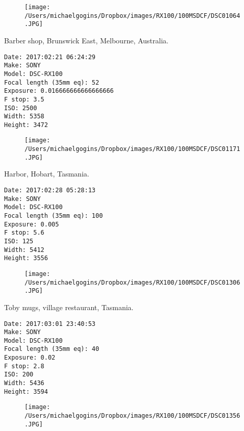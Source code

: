 \documentclass[11pt,letter,DIV=14,paper=landscape]{scrbook}
\begin{document}
\begin{figure}
\texttt{[image: /Users/michaelgogins/Dropbox/images/RX100/100MSDCF/DSC01064.JPG]}
\end{figure}
    
\clearpage
\noindent Barber shop, Brunswick East, Melbourne, Australia.
\noindent
\begin{lstlisting}
Date: 2017:02:21 06:24:29
Make: SONY
Model: DSC-RX100
Focal length (35mm eq): 52
Exposure: 0.016666666666666666
F stop: 3.5
ISO: 2500
Width: 5358
Height: 3472
\end{lstlisting}
\clearpage

\begin{figure}
\texttt{[image: /Users/michaelgogins/Dropbox/images/RX100/100MSDCF/DSC01171.JPG]}
\end{figure}
    
\clearpage
\noindent Harbor, Hobart, Tasmania.
\noindent
\begin{lstlisting}
Date: 2017:02:28 05:28:13
Make: SONY
Model: DSC-RX100
Focal length (35mm eq): 100
Exposure: 0.005
F stop: 5.6
ISO: 125
Width: 5412
Height: 3556
\end{lstlisting}
\clearpage

\begin{figure}
\texttt{[image: /Users/michaelgogins/Dropbox/images/RX100/100MSDCF/DSC01306.JPG]}
\end{figure}
    
\clearpage
\noindent Toby mugs, village restaurant, Tasmania.
\noindent
\begin{lstlisting}
Date: 2017:03:01 23:40:53
Make: SONY
Model: DSC-RX100
Focal length (35mm eq): 40
Exposure: 0.02
F stop: 2.8
ISO: 200
Width: 5436
Height: 3594
\end{lstlisting}
\clearpage

\begin{figure}
\texttt{[image: /Users/michaelgogins/Dropbox/images/RX100/100MSDCF/DSC01356.JPG]}
\end{figure}
    
\end{document}
